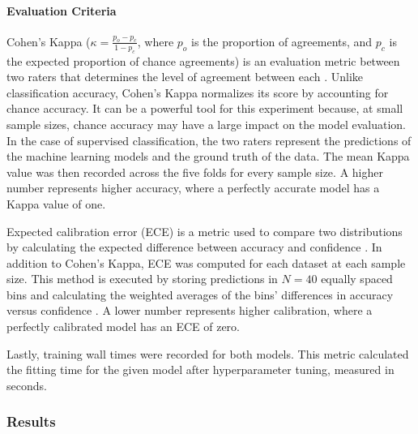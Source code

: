 \paragraph{Evaluation Criteria}
Cohen's Kappa ($\kappa = \frac{p_o - p_c}{1 - p_c}$, where $p_o$ is the proportion of agreements, and $p_c$ is the expected proportion of chance agreements) is an evaluation metric between two raters that determines the level of agreement between each \citep{cohen}.
Unlike classification accuracy, Cohen's Kappa normalizes its score by accounting for chance accuracy. It can be a powerful tool for this experiment because, at small sample sizes, chance accuracy may have a large impact on the model evaluation. In the case of supervised classification, the two raters represent the predictions of the machine learning models and the ground truth of the data. The mean Kappa value was then recorded across the five folds for every sample size. A higher number represents higher accuracy, where a perfectly accurate model has a Kappa value of one.

Expected calibration error (ECE) is a metric used to compare two distributions by calculating the expected difference between accuracy and confidence \citep{naeini2015obtaining}. In addition to Cohen's Kappa, ECE was computed for each dataset at each sample size. 
This method is executed by storing predictions in $N = 40$ equally spaced bins and calculating the weighted averages of the bins' differences in accuracy versus confidence \citep{pmlr-v70-guo17a}.
A lower number represents higher calibration, where a perfectly calibrated model has an ECE of zero.

Lastly, training wall times were recorded for both models. This metric calculated the fitting time for the given model after hyperparameter tuning, measured in seconds.

\subsubsection{Results}
